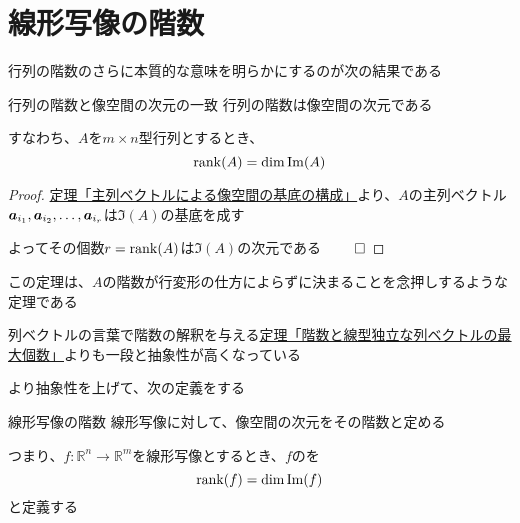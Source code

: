 \documentclass[../../../topic_linear-algebra]{subfiles}
\begin{document}
\sectionline
\section{線形写像の階数}

行列の階数のさらに本質的な意味を明らかにするのが次の結果である

\begin{theorem}{行列の階数と像空間の次元の一致}
  行列の階数は像空間の次元である

  すなわち、$A$を$m \times n$型行列とするとき、
  \begin{equation*}
    \rank(A) = \dim \Im(A)
  \end{equation*}
\end{theorem}

\begin{proof}
  \hyperref[thm:pivot-cols-form-basis]{定理「主列ベクトルによる像空間の基底の構成」}より、$A$の主列ベクトル$\vb*{a}_{i_1}, \vb*{a}_{i_2}, \dots, \vb*{a}_{i_r}$は$\Im(A)$の基底を成す

  よってその個数$r = \rank(A)$は$\Im(A)$の次元である $\qed$
\end{proof}

この定理は、$A$の階数が行変形の仕方によらずに決まることを念押しするような定理である

\br

列ベクトルの言葉で階数の解釈を与える\hyperref[thm:rank-equals-max-indep-cols]{定理「階数と線型独立な列ベクトルの最大個数」}よりも一段と抽象性が高くなっている

\br

より抽象性を上げて、次の定義をする

\begin{definition}{線形写像の階数}
  線形写像に対して、像空間の次元をその階数と定める

  つまり、$f\colon \mathbb{R}^n \to \mathbb{R}^m$を線形写像とするとき、$f$のを
  \begin{equation*}
    \rank(f) = \dim \Im(f)
  \end{equation*}
  と定義する
\end{definition}
\end{document}
